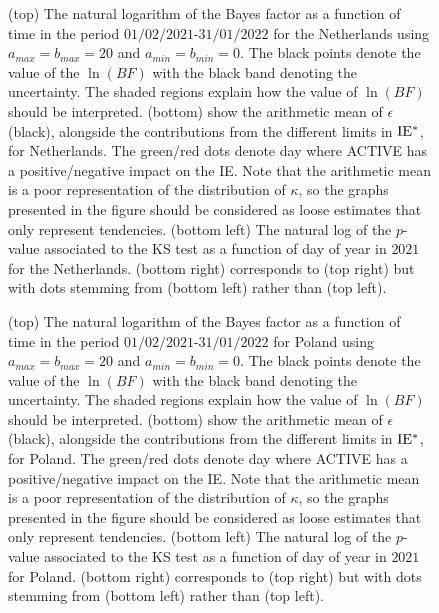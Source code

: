 \documentclass[fleqn,usenatbib,nofootinbib]{revtex4-2}
\begin{document}
\begin{appendices}
		\begin{figure}[H]
			\caption{\label{fig:a8} (top) The natural logarithm of the Bayes factor as a function of time in the period $01/02/2021$-$31/01/2022$ for the Netherlands using $a_{max}=b_{max}=20$ and $a_{min}=b_{min}=0$. The black points denote the value of the $\ln(BF)$ with the black band denoting the uncertainty. The shaded regions explain how the value of $\ln(BF)$ should be interpreted. (bottom) show the arithmetic mean of $\epsilon$ (black), alongside the contributions from the different limits in $\rm IE^*$, for Netherlands. The green/red dots denote day where ACTIVE has a positive/negative impact on the IE. Note that the arithmetic mean is a poor representation of the distribution of $\kappa$, so the graphs presented in the figure should be considered as loose estimates that only represent tendencies. (bottom left) The natural log of the $p$-value associated to the KS test as a function of day of year in $2021$ for the Netherlands. (bottom right) corresponds to (top right) but with dots stemming from (bottom left) rather than (top left).}
		\end{figure}
		
		\begin{figure}[H]
			\caption{\label{fig:a9} (top) The natural logarithm of the Bayes factor as a function of time in the period $01/02/2021$-$31/01/2022$ for Poland using $a_{max}=b_{max}=20$ and $a_{min}=b_{min}=0$. The black points denote the value of the $\ln(BF)$ with the black band denoting the uncertainty. The shaded regions explain how the value of $\ln(BF)$ should be interpreted. (bottom) show the arithmetic mean of $\epsilon$ (black), alongside the contributions from the different limits in $\rm IE^*$, for Poland. The green/red dots denote day where ACTIVE has a positive/negative impact on the IE. Note that the arithmetic mean is a poor representation of the distribution of $\kappa$, so the graphs presented in the figure should be considered as loose estimates that only represent tendencies. (bottom left) The natural log of the $p$-value associated to the KS test as a function of day of year in $2021$ for Poland. (bottom right) corresponds to (top right) but with dots stemming from (bottom left) rather than (top left).}
		\end{figure}
		

		\clearpage
		
	\end{appendices}
	
	
	
	
	\label{lastpage}
\end{document}
